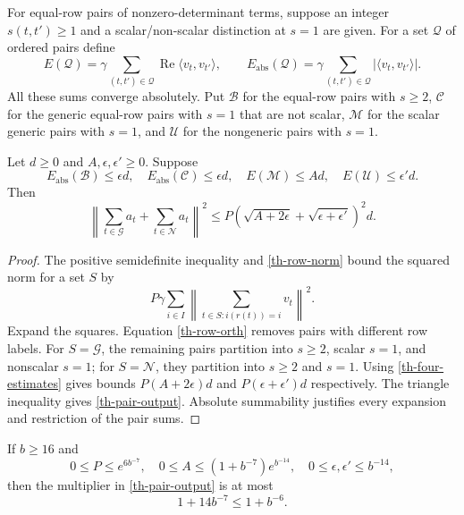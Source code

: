 For equal-row pairs of nonzero-determinant terms, suppose an integer
$s(t,t')\ge1$ and a scalar/non-scalar distinction at $s=1$ are given.
For a set $\mathcal Q$ of ordered pairs define
\[
 E(\mathcal Q)=\gamma\sum_{(t,t')\in\mathcal Q}
                    \operatorname{Re}\langle v_t,v_{t'}\rangle,
 \qquad
 E_{\mathrm{abs}}(\mathcal Q)=\gamma\sum_{(t,t')\in\mathcal Q}
                    |\langle v_t,v_{t'}\rangle|.
\]
All these sums converge absolutely.  Put $\mathcal B$ for the
equal-row pairs with $s\ge2$, $\mathcal C$ for the generic
equal-row pairs with $s=1$ that are not scalar, $\mathcal M$ for
the scalar generic pairs with $s=1$, and $\mathcal U$ for the
nongeneric pairs with $s=1$.

\begin{proposition}\label{th-pair-bound}
Let $d\ge0$ and $A,\epsilon,\epsilon'\ge0$.  Suppose
\begin{equation}\label{th-four-estimates}
 E_{\mathrm{abs}}(\mathcal B)\le\epsilon d,\quad
 E_{\mathrm{abs}}(\mathcal C)\le\epsilon d,\quad
 E(\mathcal M)\le A d,\quad E(\mathcal U)\le\epsilon'd.
\end{equation}
Then
\begin{equation}\label{th-pair-output}
 \left\|\sum_{t\in\mathcal G}a_t+
             \sum_{t\in\mathcal N}a_t\right\|^2
 \le P\left(\sqrt{A+2\epsilon}
                  +\sqrt{\epsilon+\epsilon'}\right)^2d.
\end{equation}
\end{proposition}

\begin{proof}
The positive semidefinite inequality and
\eqref{th-row-norm} bound the squared norm for a set $S$ by
\[
 P\gamma\sum_{i\in I}
       \left\|\sum_{t\in S:i(r(t))=i}v_t\right\|^2.
\]
Expand the squares.  Equation \eqref{th-row-orth} removes pairs
with different row labels.  For $S=\mathcal G$, the remaining
pairs partition into $s\ge2$, scalar $s=1$, and nonscalar $s=1$;
for $S=\mathcal N$, they partition into $s\ge2$ and $s=1$.
Using \eqref{th-four-estimates} gives bounds
$P(A+2\epsilon)d$ and $P(\epsilon+\epsilon')d$ respectively.
The triangle inequality gives \eqref{th-pair-output}.  Absolute
summability justifies every expansion and restriction of the pair sums.
\end{proof}

\begin{lemma}\label{th-small-errors}
If $b\ge16$ and
\[
 0\le P\le e^{6b^{-7}},\quad
 0\le A\le(1+b^{-7})e^{b^{-14}},\quad
 0\le\epsilon,\epsilon'\le b^{-14},
\]
then the multiplier in \eqref{th-pair-output} is at most
\begin{equation}\label{th-sharper-error}
 1+14b^{-7}\le1+b^{-6}.
\end{equation}
\end{lemma}

